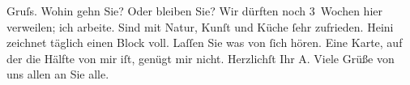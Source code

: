                Gruſs. Wohin gehn Sie? Oder bleiben Sie? Wir dürften noch 3 Wochen hier verweilen;
               ich arbeite. Sind mit Natur, Kunſt und Küche{ }ſehr zufrieden. Heini zeichnet täglich einen Block voll. Laſſen Sie was von{ }ſich hören. Eine Karte, auf der die Hälfte von mir iſt, genügt mir nicht.\pend
           \pstart Herzlichſt
               Ihr \spacefill\mbox{A.}\pend{}
\pstart
           \noindent{}{\pb}Viele Grüße von uns allen an Sie alle.\pend
           \endnumbering{}  \newcommand{\dateiname}{L01613}\newcommand{\titel}{Arthur Schnitzler an Richard Beer-Hofmann, 1[7?]. 7. 1906}\newcommand{\editorInnen}{Martin Anton Müller und Gerd-Hermann Susen}
